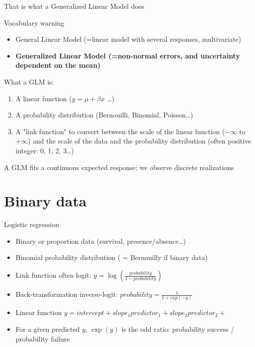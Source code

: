 \documentclass[10pt]{beamer}
\begin{document}
\begin{frame}{That is what a Generalized Linear Model does}

\begin{block}{Vocabulary warning}
  \begin{itemize}
    \item General Linear Model (=linear model with several responses, multivariate)
    \item \textbf{Generalized Linear Model (=non-normal errors, and uncertainty dependent on the mean)} 
  \end{itemize}
\end{block}

\pause

\begin{block}{What a GLM is:}
  \begin{enumerate}
    \item A linear function ($y = \mu + \beta x$ \dots)
    \item A probability distribution (Bernouilli, Binomial, Poisson\dots)
    \item A "link function" to convert between the scale of the linear function ($-\infty$ to $+\infty$) and the scale of the data and the probability distribution (often positive integer: 0, 1, 2, 3\dots)
  \end{enumerate}
  A GLM fits a continuous expected response; we observe discrete realizations
\end{block}

\end{frame}


\section{Binary data}

\begin{frame}{Logistic regression}

  \begin{block}{}
   
\begin{itemize}[<+->]
    \item Binary or proportion data (survival, presence/absence\dots)
    \item Binomial probability distribution ( = Bernouilly if binary data)
    \item Link function often logit: $y=\log(\frac{probability}{1-probability})$
    \item Back-transformation inverse-logit: $probability = \frac{1}{1 + exp(-y)}$
    \item Linear function $y = intercept + slope_1 predictor_1 + slope_2 predictor_2 +$
    \item For a given predicted $y$, $\exp(y)$ is the odd ratio: probability success / probability failure
  \end{itemize}
  
  
  \end{block}

  \end{frame}
  
\end{document}
